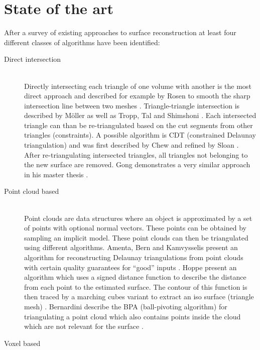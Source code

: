 
\section{State of the art}

After a survey of existing approaches to surface reconstruction at least four different classes of algorithms have been identified:

\begin{description}
	
\item[Direct intersection] \hfill \\
Directly intersecting each triangle of one volume with another is the most direct approach and described for example by Rosen to smooth the sharp intersection line between two meshes \cite{mesh_intersection}. Triangle-triangle intersection is described by M\"oller \cite{tri_tri_intersection_moller} as well as Tropp, Tal and Shimshoni \cite{tri_tri_intersection_2}. Each intersected triangle can than be re-triangulated based on the cut segments from other triangles (constraints). A possible algorithm is CDT (constrained Delaunay triangulation) and was first described by Chew \cite{CDT} and refined by Sloan \cite{CDT_fast}. After re-triangulating intersected triangles, all triangles not belonging to the new surface are removed. Gong demonstrates a very similar approach in his master thesis \cite{cutter_workpiece_engagement}.

\item[Point cloud based] \hfill \\
Point clouds are data structures where an object is approximated by a set of points with optional normal vectors. These points can be obtained \eg by sampling an implicit model. These point clouds can then be triangulated using different algorithms. 
Amenta, Bern and Kamvysselis present an algorithm for reconstructing Delaunay triangulations from point clouds with certain quality guarantees for \enquote{good} inputs \cite{vornoi_surface_reconstruction}.
Hoppe \etal present an algorithm which uses a signed distance function to describe the distance from each point to the estimated surface. The contour of this function is then traced by a marching cubes variant to extract an iso surface (triangle mesh) \cite{surface_reconstruction}.
Bernardini \etal describe the BPA (ball-pivoting algorithm) for triangulating a point cloud which also contains points inside the cloud which are not relevant for the surface \cite{BPA}.


\item[Voxel based] \hfill \\


\end{description}
